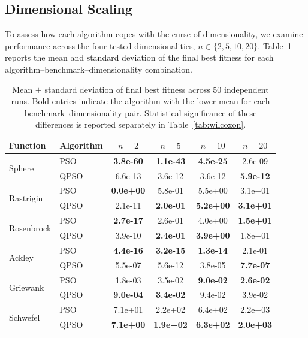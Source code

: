 \subsection{Dimensional Scaling}
\label{subsec:scaling}

To assess how each algorithm copes with the curse of dimensionality, we examine performance across the four tested dimensionalities, $n \in \{2, 5, 10, 20\}$. Table~\ref{tab:scaling-results} reports the mean and standard deviation of the final best fitness for each algorithm--benchmark--dimensionality combination.

\begin{table}[htbp]
\centering
\caption{Mean $\pm$ standard deviation of final best fitness across 50 independent runs. Bold entries indicate the algorithm with the lower mean for each benchmark--dimensionality pair. Statistical significance of these differences is reported separately in Table~\ref{tab:wilcoxon}.}
\label{tab:scaling-results}
\small
\setlength{\tabcolsep}{4pt}
\begin{tabular}{@{}llcccc@{}}
\toprule
\textbf{Function} & \textbf{Algorithm} & $n=2$ & $n=5$ & $n=10$ & $n=20$ \\
\midrule
\multirow{2}{*}{Sphere}
 & PSO  & \textbf{3.8e-60} & \textbf{1.1e-43} & \textbf{4.5e-25} & 2.6e-09 \\
 & QPSO & 6.6e-13 & 3.6e-12 & 3.6e-12 & \textbf{5.9e-12} \\
\midrule
\multirow{2}{*}{Rastrigin}
 & PSO  & \textbf{0.0e+00} & 5.8e-01 & 5.5e+00 & 3.1e+01 \\
 & QPSO & 2.1e-11 & \textbf{2.0e-01} & \textbf{5.2e+00} & \textbf{3.1e+01} \\
\midrule
\multirow{2}{*}{Rosenbrock}
 & PSO  & \textbf{2.7e-17} & 2.6e-01 & 4.0e+00 & \textbf{1.5e+01} \\
 & QPSO & 3.9e-10 & \textbf{2.4e-01} & \textbf{3.9e+00} & 1.8e+01 \\
\midrule
\multirow{2}{*}{Ackley}
 & PSO  & \textbf{4.4e-16} & \textbf{3.2e-15} & \textbf{1.3e-14} & 2.1e-01 \\
 & QPSO & 5.5e-07 & 5.6e-12 & 3.8e-05 & \textbf{7.7e-07} \\
\midrule
\multirow{2}{*}{Griewank}
 & PSO  & 1.8e-03 & 3.5e-02 & \textbf{9.0e-02} & \textbf{2.6e-02} \\
 & QPSO & \textbf{9.0e-04} & \textbf{3.4e-02} & 9.4e-02 & 3.9e-02 \\
\midrule
\multirow{2}{*}{Schwefel}
 & PSO  & 7.1e+01 & 2.2e+02 & 6.4e+02 & 2.2e+03 \\
 & QPSO & \textbf{7.1e+00} & \textbf{1.9e+02} & \textbf{6.3e+02} & \textbf{2.0e+03} \\
\bottomrule
\end{tabular}
\end{table}

